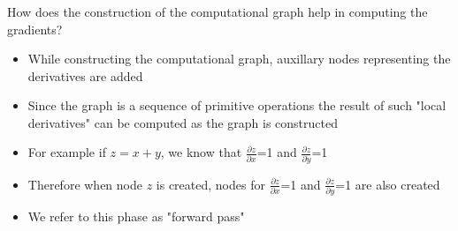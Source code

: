 \documentclass{beamer}
\theoremstyle{plain} %
\theoremstyle{example} %
\newcommand{\deriv}[2]{\ensuremath{\frac{\partial #1}{\partial #2}}}
\begin{document}
\begin{frame}
    \frametitle{}
    How does the construction of the computational graph help in computing the gradients?
\begin{itemize}
    
    \item While constructing the computational graph, auxillary nodes representing the derivatives are added
    \item Since the graph is a sequence of primitive operations the result of such "local derivatives" can be computed as the graph is constructed  
    \item For example if $z=x+y$, we know that \deriv{z}{x}=1 and \deriv{z}{y}=1
    \item Therefore when node $z$ is created, nodes for \deriv{z}{x}=1 and \deriv{z}{y}=1 are also created
    \item We refer to this phase as "forward pass"
\end{itemize}
\end{frame}
\end{document}
